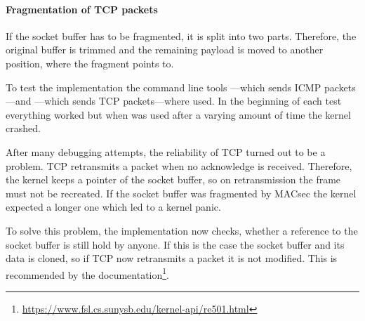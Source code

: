 \paragraph{Fragmentation of TCP packets}
If the socket buffer has to be fragmented, it is split into two parts.
Therefore, the original buffer is trimmed and the remaining payload is moved to another position, where the fragment points to.

To test the implementation the command line tools ---which sends ICMP packets---and  ---which sends \gls{TCP} packets---where used.
In the beginning of each test everything worked but when  was used after a varying amount of time the kernel crashed.

After many debugging attempts, the reliability of \gls{TCP} turned out to be a problem.
\gls{TCP} retransmits a packet when no acknowledge is received.
Therefore, the kernel keeps a pointer of the socket buffer, so on retransmission the frame must not be recreated.
If the socket buffer was fragmented by \gls{MACsec} the kernel expected a longer one which led to a kernel panic.

To solve this problem, the implementation now checks, whether a reference to the socket buffer is still hold by anyone.
If this is the case the socket buffer and its data is cloned, so if \gls{TCP} now retransmits a packet it is not modified.
This is recommended by the documentation\footnote{\url{https://www.fsl.cs.sunysb.edu/kernel-api/re501.html}}.
